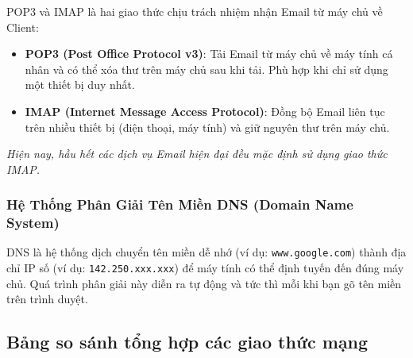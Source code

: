 \documentclass[11pt,oneside]{book}
\newcommand{\thd}[1]{\textcolor{white}{\textbf{\strut #1}}}
\newcommand{\codeinline}[1]{\textcolor{accentOrange}{\texttt{#1}}}
\begin{document}
POP3 và IMAP là hai giao thức chịu trách nhiệm nhận Email từ máy chủ về Client:
\begin{itemize}[leftmargin=1.8em, itemsep=2pt, parsep=0pt]
    \item \textbf{POP3 (Post Office Protocol v3)}: Tải Email từ máy chủ về máy tính cá nhân và có thể xóa thư trên máy chủ sau khi tải. Phù hợp khi chỉ sử dụng một thiết bị duy nhất.
    \item \textbf{IMAP (Internet Message Access Protocol)}: Đồng bộ Email liên tục trên nhiều thiết bị (điện thoại, máy tính) và giữ nguyên thư trên máy chủ.
\end{itemize}
\textit{Hiện nay, hầu hết các dịch vụ Email hiện đại đều mặc định sử dụng giao thức IMAP.}

\subsubsection{Hệ Thống Phân Giải Tên Miền DNS (Domain Name System)}

DNS là hệ thống dịch chuyển tên miền dễ nhớ (ví dụ: \codeinline{www.google.com}) thành địa chỉ IP số (ví dụ: \codeinline{142.250.xxx.xxx}) để máy tính có thể định tuyến đến đúng máy chủ. Quá trình phân giải này diễn ra tự động và tức thì mỗi khi bạn gõ tên miền trên trình duyệt.

\subsection{Bảng so sánh tổng hợp các giao thức mạng}

\begin{prettyTableBox}
\end{prettyTableBox}
\end{document}

